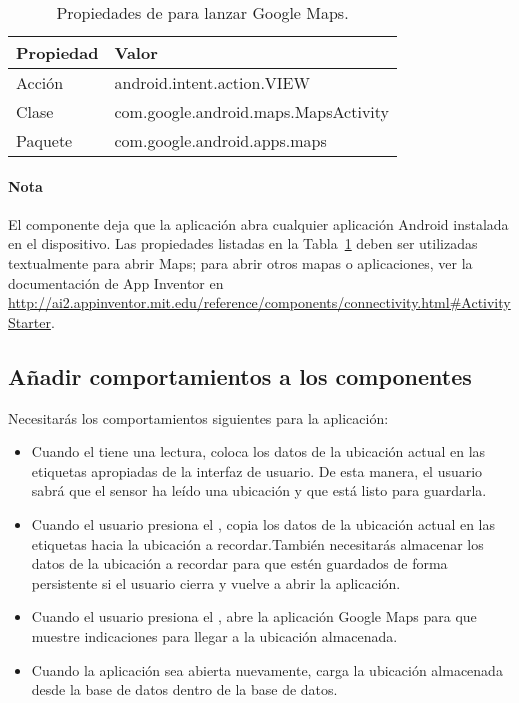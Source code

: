 \begin{table}
\centering
\begin{footnotesize}
\begin{tabular}{|l|p{7cm}|}
\hline
Propiedad & Valor \\\hline
Acción & android.intent.action.VIEW \\\hline
Clase & com.google.android.maps.MapsActivity \\\hline
Paquete & com.google.android.apps.maps \\\hline
\end{tabular}
\end{footnotesize}
\caption{Propiedades de  para lanzar Google Maps.}
\label{tab:Sensors2}
\end{table}

\paragraph{Nota} El componente  deja que la
aplicación abra cualquier aplicación Android instalada en el
dispositivo. Las propiedades listadas en la Tabla~\ref{tab:Sensors2}
deben ser utilizadas textualmente para abrir Maps; para abrir otros
mapas o aplicaciones, ver la documentación de App Inventor en
\url{http://ai2.appinventor.mit.edu/reference/components/connectivity.html#ActivityStarter}.

\subsection*{Añadir comportamientos a los componentes}

{Necesitarás los comportamientos siguientes para la aplicación:}

\begin{itemize}
\item Cuando el  tiene una lectura,
  coloca los datos de la ubicación actual en las etiquetas apropiadas
  de la interfaz de usuario. De esta manera, el usuario sabrá que el
  sensor ha leído una ubicación y que está listo para guardarla.

\item Cuando el usuario presiona el , copia
  los datos de la ubicación actual en las etiquetas hacia la ubicación
  a recordar.También necesitarás almacenar los datos de la ubicación a
  recordar para que estén guardados de forma persistente si el usuario
  cierra y vuelve a abrir la aplicación.

\item Cuando el usuario presiona el
  , abre la aplicación Google Maps
  para que muestre indicaciones para llegar a la ubicación almacenada.

\item Cuando la aplicación sea abierta nuevamente, carga la ubicación
  almacenada desde la base de datos dentro de la base de datos.
\end{itemize}

